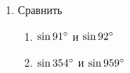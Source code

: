 \documentclass[12pt, a4paper]{article}
\begin{document}
\begin{enumerate}
		\begin{multicols}{2}
			\begin{enumerate}[label=\asbuk*)]
				\item $1-\sin^2x$
				\item $\cos^2x-1$
				\item $(1+\sin x)(1- \sin x)$
				\item $2 - \sin^2x - \cos^2x$
			\end{enumerate}
		\end{multicols}
		\item Сравнить
		\begin{multicols}{2}
			\begin{enumerate}[label=\asbuk*)]
				\item $\sin 91\degree$ и $\sin 92\degree$
				\item $\sin 354\degree$ и $\sin 959\degree$
			\end{enumerate}
		\end{multicols} 
	\end{enumerate}
	
\end{document}
